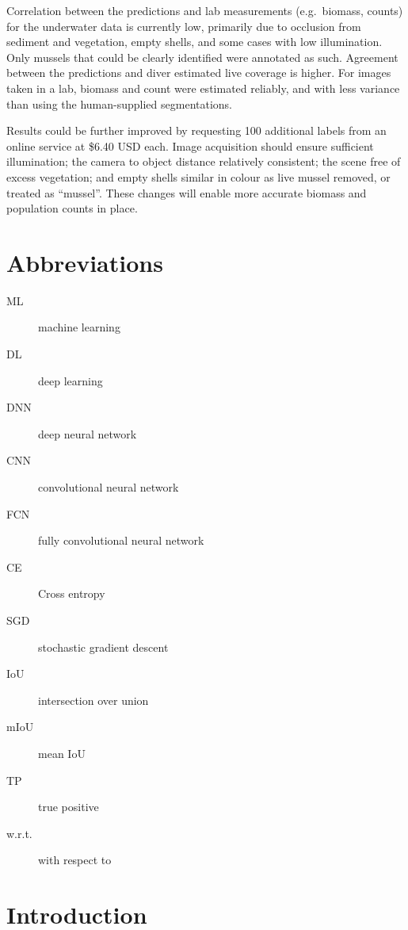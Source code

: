 \documentclass[11pt]{article} %
\begin{document}
Correlation between the predictions and lab measurements (e.g.~biomass, 
counts) for the underwater data is currently low, primarily due to occlusion 
from sediment and vegetation, empty shells, and some cases with low 
illumination. Only mussels that could be clearly identified were annotated as 
such. Agreement between the predictions and diver estimated live coverage is
higher.
For images taken in a lab, biomass and count were estimated reliably, and 
with less variance than using the human-supplied segmentations. 

Results could be further improved by requesting 100 additional labels
from an online service at \$6.40 USD each. Image acquisition should ensure 
sufficient illumination; the camera to object distance relatively consistent;
the scene free of excess vegetation; and empty shells similar in colour as live 
mussel removed, or treated as ``mussel''. These changes will enable more 
accurate biomass and population counts in place.

\clearpage

\tableofcontents

\clearpage

\section*{Abbreviations}

\begin{description}
\item[ML] machine learning
\item[DL] deep learning
\item[DNN] deep neural network
\item[CNN] convolutional neural network
\item[FCN] fully convolutional neural network
\item[CE] Cross entropy
\item[SGD] stochastic gradient descent
\item[IoU] intersection over union
\item[mIoU] mean IoU
\item[TP] true positive
\item[w.r.t.] with respect to
\end{description}

\clearpage

\setcounter{page}{1}

\section{Introduction}
\end{document}
